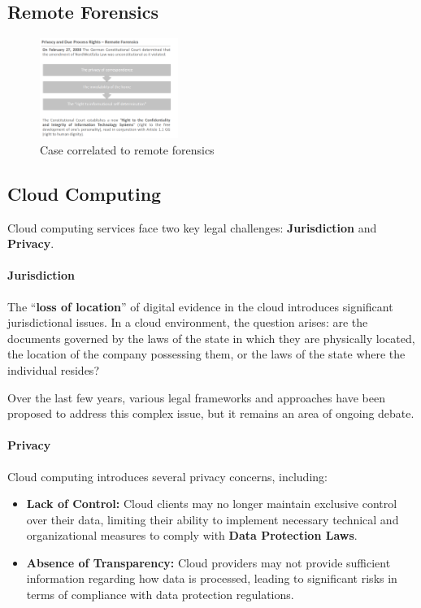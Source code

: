 
\subsection{Remote Forensics}

\begin{figure}[h!]
    \centering
    \includegraphics[width=0.4\textwidth]{img/remote_case.png}
    \caption{Case correlated to remote forensics}
    \label{fig:remote process}
\end{figure}

\subsection{Cloud Computing}

Cloud computing services face two key legal challenges: \textbf{Jurisdiction} and \textbf{Privacy}.

\paragraph{Jurisdiction}
The “\textbf{loss of location}” of digital evidence in the cloud introduces significant jurisdictional issues. In a cloud environment, the question arises: are the documents governed by the laws of the state in which they are physically located, the location of the company possessing them, or the laws of the state where the individual resides?

Over the last few years, various legal frameworks and approaches have been proposed to address this complex issue, but it remains an area of ongoing debate.

\paragraph{Privacy}
Cloud computing introduces several privacy concerns, including:
\begin{itemize}
    \item \textbf{Lack of Control:} Cloud clients may no longer maintain exclusive control over their data, limiting their ability to implement necessary technical and organizational measures to comply with \textbf{Data Protection Laws}.
    \item \textbf{Absence of Transparency:} Cloud providers may not provide sufficient information regarding how data is processed, leading to significant risks in terms of compliance with data protection regulations.
\end{itemize}



